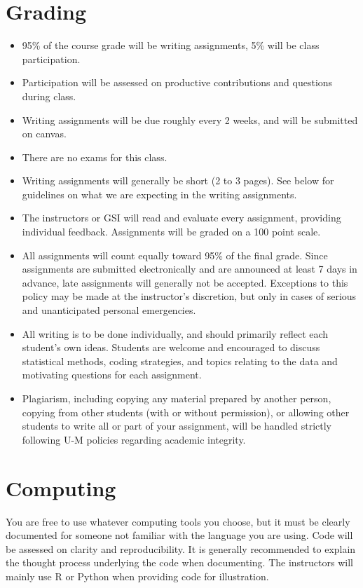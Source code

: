 \documentclass[11pt]{article}
\begin{document}
\section*{Grading}
\begin{itemize}
	\item 95\% of the course grade will be writing assignments, 5\% will be class participation.
	\item Participation will be assessed on productive contributions and questions during class.
	\item Writing assignments will be due roughly every 2 weeks, and will be submitted on canvas.
	\item There are no exams for this class.
	\item Writing assignments will generally be short (2 to 3 pages). See below for guidelines on what we are expecting in the writing assignments.
	\item The instructors or GSI will read and evaluate every assignment, providing individual feedback. Assignments will be graded on a 100 point scale.
	\item All assignments will count equally toward 95\% of the final grade. Since assignments are submitted electronically and are announced at least 7 days in advance, late assignments will generally not be accepted. Exceptions to this policy may be made at the instructor’s discretion, but only in cases of serious and unanticipated personal emergencies.
	\item All writing is to be done individually, and should primarily reflect each student’s own ideas. Students are welcome and encouraged to discuss statistical methods, coding strategies, and topics relating to the data and motivating questions for each assignment.
	\item Plagiarism, including copying any material prepared by another person, copying from other students (with or without permission), or allowing other students to write all or part of your assignment, will be handled strictly following U-M policies regarding academic integrity.
\end{itemize}

\section*{Computing}

You are free to use whatever computing tools you choose, but it must be clearly documented for someone not familiar with the language you are using.
Code will be assessed on clarity and reproducibility.
It is generally recommended to explain the thought process underlying the code when documenting.
The instructors will mainly use R or Python when providing code for illustration.
\end{document}
